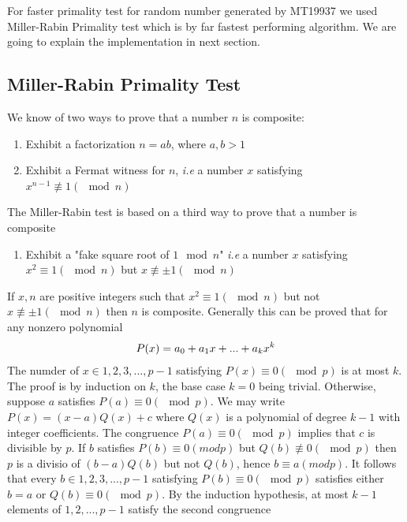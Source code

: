 \documentclass[12pt,journal,compsoc]{IEEEtran}
\begin{document}
For faster primality test for random number generated by MT19937 we used Miller-Rabin Primality test which is by far fastest performing algorithm. We are going to explain the implementation in next section.

\subsection{{Miller-Rabin Primality Test\cite{miller-rabin}}}
We know of two ways to prove that a number $n$ is composite:
\begin{enumerate}
\item Exhibit a factorization $n = ab$, where $a,b >1$
\item Exhibit a Fermat\cite{fermat} witness for $n$, \emph{i.e} a number $x$ satisfying $x^{n-1}\not\equiv 1 (\mod n)$
\end{enumerate}
The Miller-Rabin test is based on a third way to prove that a number is composite
\begin{enumerate}[ {}3{)} ]
\item Exhibit a "fake square root of $1 \mod n$" \emph{i.e} a number $x$ satisfying $x^{2} \equiv 1(\mod n)$ but $x \not \equiv \pm1 (\mod n)$
\end{enumerate}

If $x, n$ are positive integers such that $x^{2} \equiv 1 (\mod n)$ but not $x \not \equiv \pm1 (\mod n)$ then $n$ is composite. Generally this can be proved that for any nonzero polynomial
\begin{align}
P(x) = a_0 + a_1x + ... + a_kx^k \notag
\end{align}
The numder of $x \in {1, 2, 3, ... , p-1}$ satisfying $P(x) \equiv 0 (\mod p)$ is at most $k$. The proof is by induction on $k$, the base case $k = 0$ being trivial. Otherwise, suppose $a$ satisfies $P(a) \equiv 0 (\mod p)$. We may write $P(x) = (x - a)Q(x) + c$ where $Q(x)$ is a polynomial of degree $k-1$ with integer coefficients. The congruence $P(a) \equiv 0 (\mod p)$ implies that $c$ is divisible by $p$. If $b$ satisfies $P(b) \equiv 0 (mod p)$ but $Q(b) \not \equiv 0 (\mod p)$ then $p$ is a divisio of $(b-a)Q(b)$ but not $Q(b)$, hence $b \equiv a (mod p)$. It follows that every $b \in {1,2,3,...,p-1}$ satisfying $P(b) \equiv 0 (\mod p)$ satisfies either $b = a$ or $Q(b)\equiv 0(\mod p)$. By the induction hypothesis, at most $k-1$ elements of ${1, 2,...,p-1}$ satisfy the second congruence\cite{miller-rabin}
\end{document}
